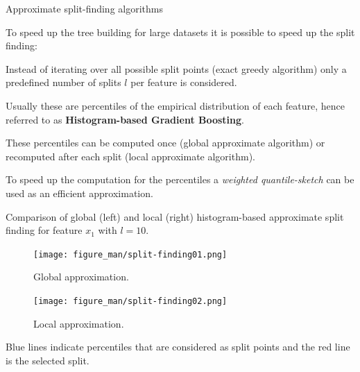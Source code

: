 \begin{vbframe}{Approximate split-finding algorithms}

To speed up the tree building for large datasets it is possible to speed up the split finding:

\lz

Instead of iterating over all possible split points (exact greedy algorithm) only a predefined number of splits $l$ per feature is considered.

\lz

Usually these are percentiles of the empirical distribution of each feature, hence referred to as \textbf{Histogram-based Gradient Boosting}.

\lz

These percentiles can be computed once (global approximate algorithm) or recomputed after each split (local approximate algorithm).

\lz

To speed up the computation for the percentiles a \emph{weighted quantile-sketch} can be used as an efficient approximation.


\framebreak

Comparison of global (left) and local (right) histogram-based approximate split finding for feature $x_1$ with $l=10$.

\lz

\begin{small}
\begin{minipage}[b]{0.49\textwidth}
\begin{figure}
  \texttt{[image: figure\_man/split-finding01.png]}
  \caption*{Global approximation.}
\end{figure}

\end{minipage}
\begin{minipage}[b]{0.49\textwidth}
  \begin{figure}
    \texttt{[image: figure\_man/split-finding02.png]}
    \caption*{Local approximation.}
  \end{figure}
\end{minipage}
\end{small}

\lz

Blue lines indicate percentiles that are considered as split points and the red line is the selected split.

\framebreak


\end{vbframe}
